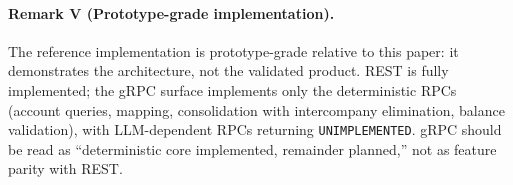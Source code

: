 \paragraph{Remark V (Prototype-grade implementation).} The reference
implementation is prototype-grade relative to this paper: it demonstrates the
architecture, not the validated product. REST is fully implemented; the gRPC
surface implements only the deterministic RPCs (account queries, mapping,
consolidation with intercompany elimination, balance validation), with
LLM-dependent RPCs returning \texttt{UNIMPLEMENTED}. gRPC should be read as
``deterministic core implemented, remainder planned,'' not as feature parity with
REST.
